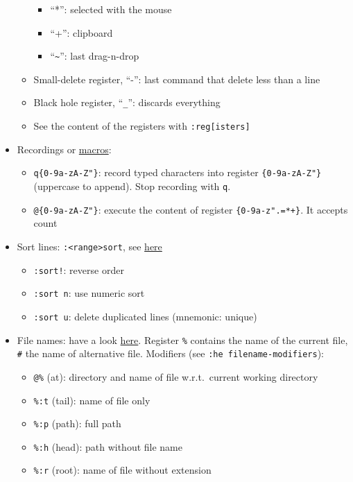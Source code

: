 \documentclass[a4paper,12pt,%
              final%
              ]{article}
\begin{document}
\begin{itemize}
\begin{itemize}
\begin{itemize}
          \item ``*'': selected with the mouse
          \item ``+'': clipboard
          \item ``\verb|~|'': last drag-n-drop
        \end{itemize}
      \item Small-delete register, ``-'': last command that delete less than a line
      \item Black hole register, ``\verb|_|'': discards everything
      \item See the content of the registers with \verb|:reg[isters]|
    \end{itemize}
  \item Recordings or
    \href{https://vim.fandom.com/wiki/Macros#Viewing_a_macro}{macros}:
    \begin{itemize}
      \item \verb|q{0-9a-zA-Z"}|: record typed characters into register
        \verb|{0-9a-zA-Z"}| (uppercase to append). Stop recording with \verb|q|.
      \item \verb|@{0-9a-zA-Z"}|: execute the content of register
        \verb|{0-9a-z".=*+}|. It accepts count
    \end{itemize}
  \item Sort lines: \verb|:<range>sort|, see \href{https://vim.fandom.com/wiki/Sort_lines}{here}
    \begin{itemize}
      \item \verb|:sort!|: reverse order
      \item \verb|:sort n|: use numeric sort
      \item \verb|:sort u|: delete duplicated lines (mnemonic: unique)
    \end{itemize}
  \item File names: have a look \href{https://vim.fandom.com/wiki/Get_the_name_of_the_current_file}{here}.
    Register \verb|%| contains the name of the current file, \verb|#| the name of alternative file.
    Modifiers (see \verb|:he filename-modifiers|):
    \begin{itemize}
      \item \verb|@%| (at): directory and name of file w.r.t.~current working directory
      \item \verb|%:t| (tail): name of file only
      \item \verb|%:p| (path): full path
      \item \verb|%:h| (head): path without file name
      \item \verb|%:r| (root): name of file without extension

\end{itemize}
\end{itemize}
\end{document}
